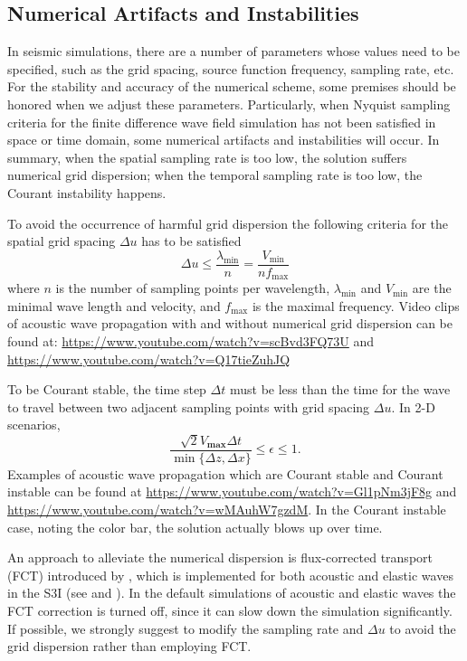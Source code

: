 \documentclass[11pt,titlepage]{article}
\theoremstyle{plain}
\theoremstyle{definition}
\theoremstyle{remark}
\numberwithin{equation}{section}
\begin{document}
\subsection{Numerical Artifacts and Instabilities}
In seismic simulations, there are a number of parameters whose values need to be specified, such as the grid spacing, source function frequency, sampling rate, etc. For the stability and accuracy of the numerical scheme, some premises should be honored when we adjust these parameters. Particularly, when Nyquist sampling criteria for the finite difference wave field simulation has not been satisfied in space or time domain, some numerical artifacts and instabilities will occur. In summary, when the spatial sampling rate is too low,  the solution suffers numerical grid dispersion; when the temporal sampling rate is too low, the Courant instability happens.

To avoid the occurrence of harmful grid dispersion the following criteria for the spatial grid spacing $\Delta u$ has to be satisfied
\begin{equation}
  \Delta u \leq \frac{\lambda_{\min}}{n} = \frac{V_{\min}}{nf_{\max}}
\end{equation}
where $n$ is the number of sampling points per wavelength, $\lambda_{\min}$ and $V_{\min}$ are the minimal wave length and velocity, and $f_{\max}$ is the maximal frequency. Video clips of acoustic wave propagation with and without numerical grid dispersion can be found at: \url{https://www.youtube.com/watch?v=scBvd3FQ73U} and \url{https://www.youtube.com/watch?v=Q17tieZuhJQ}

To be Courant stable, the time step $\Delta t$ must be less than the time for the wave to travel between two adjacent sampling points with grid spacing $\Delta u$. In 2-D scenarios,
\begin{equation}
\frac{\sqrt{2}V_{\textbf{max}}\Delta t}{\min\{\Delta z, \Delta x\}}\le \epsilon \le 1.
\end{equation}
Examples of acoustic wave propagation which are Courant stable and Courant instable can be found at \url{https://www.youtube.com/watch?v=Gl1pNm3jF8g} and \url{https://www.youtube.com/watch?v=wMAuhW7gzdM}. In the Courant instable case, noting the color bar, the solution actually blows up over time.

An approach to alleviate the numerical dispersion is flux-corrected transport (FCT) introduced by \cite{Fei:1995aa}, which is implemented for both acoustic and elastic waves in the S3I (see  and ). In the default simulations of acoustic and elastic waves the FCT correction is turned off, since it can slow down the simulation significantly. If possible, we strongly suggest to modify the sampling rate and $\Delta u$ to avoid the grid dispersion rather than employing FCT.  
\end{document}
